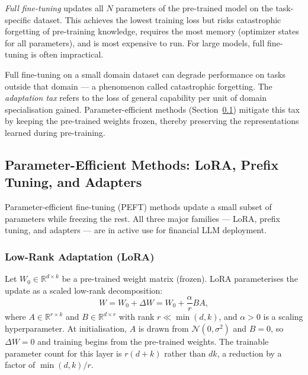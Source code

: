 \begin{deepdive}
\emph{Full fine-tuning} updates all $N$ parameters of the pre-trained model
on the task-specific dataset.  This achieves the lowest training loss but
risks catastrophic forgetting of pre-training knowledge, requires the most
memory (optimizer states for all parameters), and is most expensive to run.
For large models, full fine-tuning is often impractical.

\begin{remark}
\label{rem:adaptation-tax}
Full fine-tuning on a small domain dataset can degrade performance on tasks
outside that domain --- a phenomenon called catastrophic forgetting.  The
\emph{adaptation tax} refers to the loss of general capability per unit of
domain specialisation gained.  Parameter-efficient methods (Section~\ref{subsec:peft})
mitigate this tax by keeping the pre-trained weights frozen, thereby preserving
the representations learned during pre-training.
\end{remark}

\subsection{Parameter-Efficient Methods: LoRA, Prefix Tuning, and Adapters}
\label{subsec:peft}

Parameter-efficient fine-tuning (PEFT) methods update a small subset of
parameters while freezing the rest.  All three major families ---  LoRA,
prefix tuning, and adapters --- are in active use for financial LLM deployment.

\subsubsection*{Low-Rank Adaptation (LoRA)}

\begin{definition}
\label{def:lora}
Let $W_0 \in \mathbb{R}^{d \times k}$ be a pre-trained weight matrix (frozen).
LoRA \cite{hu2022lora} parameterises the update as a scaled low-rank decomposition:
\begin{equation}
  W = W_0 + \Delta W = W_0 + \frac{\alpha}{r} B A,
  \label{eq:lora}
\end{equation}
where $A \in \mathbb{R}^{r \times k}$ and $B \in \mathbb{R}^{d \times r}$
with rank $r \ll \min(d, k)$, and $\alpha > 0$ is a scaling hyperparameter.
At initialisation, $A$ is drawn from $\mathcal{N}(0, \sigma^2)$
and $B = 0$, so $\Delta W = 0$ and training begins from the pre-trained weights.
The trainable parameter count for this layer is $r(d + k)$ rather than $dk$,
a reduction by a factor of $\min(d, k)/r$.
\end{definition}


\end{deepdive}
